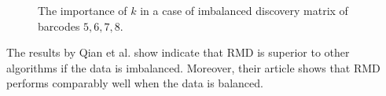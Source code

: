 \begin{figure}[!ht]
    \centering
    \qquad
    \caption[Iterative scaling]{The importance of $k$ in a case of imbalanced discovery matrix of barcodes $5,6,7,8$.}    \label{fig:cut_acc+_plot}%
\end{figure}

The results by Qian et al. show indicate that RMD is superior to other algorithms if the data is imbalanced. Moreover, their article shows that RMD performs comparably well when the data is balanced.

